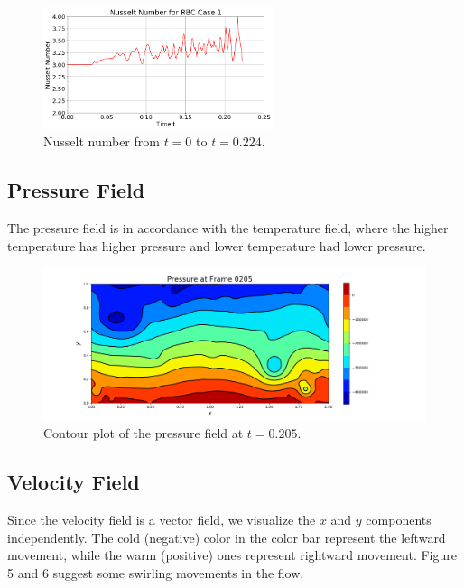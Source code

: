 \documentclass[11pt]{article} %
\begin{document}
\begin{figure}[h!]
\centering
\includegraphics[width=0.6\textwidth]{nusselt.png}
\caption{Nusselt number from $t=0$ to $t=0.224$.}
\end{figure}

\subsection{Pressure Field}
The pressure field is in accordance with the temperature field, where the higher temperature has higher pressure and lower temperature had lower pressure.
\begin{figure}[h!]
\centering
\hspace*{-0.25in}
\includegraphics[width=1.2\textwidth]{pressure.png}
\caption{Contour plot of the pressure field at $t=0.205$.}
\end{figure}
\newpage

\subsection{Velocity Field}
Since the velocity field is a vector field, we visualize the $x$ and $y$ components independently. The cold (negative) color in the color bar represent the leftward movement, while the warm (positive) ones represent rightward movement. Figure 5 and 6 suggest some swirling movements in the flow.
\end{document}
